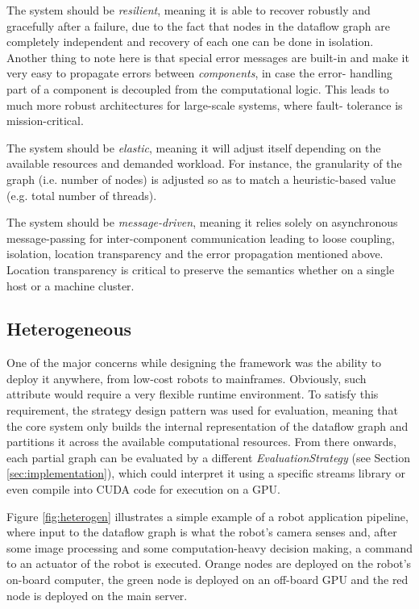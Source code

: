 \documentclass[sigplan,review,anonymous]{acmart}
\begin{document}
The system should be \textit{resilient}, meaning it is able to recover robustly
and gracefully after a failure, due to the fact that nodes in the dataflow graph
are completely independent and recovery of each one can be done in isolation.
Another thing to note here is that special error messages are built-in and make
it very easy to propagate errors between \textit{components}, in case the error-
handling part of a component is decoupled from the computational logic. This
leads to much more robust architectures for large-scale systems, where fault-
tolerance is mission-critical.

The system should be \textit{elastic}, meaning it will adjust itself depending
on the available resources and demanded workload. For instance, the granularity
of the graph (i.e. number of nodes) is adjusted so as to match a heuristic-based
value (e.g. total number of threads).

The system should be \textit{message-driven}, meaning it relies solely on
asynchronous message-passing for inter-component communication leading to loose
coupling, isolation, location transparency and the error propagation mentioned
above. Location transparency is critical to preserve the semantics whether on a
single host or a machine cluster.

\subsection{Heterogeneous}

One of the major concerns while designing the framework was the ability to
deploy it anywhere, from low-cost robots to mainframes. Obviously, such
attribute would require a very flexible runtime environment. To satisfy this
requirement, the strategy design pattern was used for evaluation, meaning that
the core system only builds the internal representation of the dataflow graph
and partitions it across the available computational resources. From there
onwards, each partial graph can be evaluated by a different
\textit{EvaluationStrategy} (see Section \ref{sec:implementation}), which could
interpret it using a specific streams library or even compile into CUDA code for
execution on a GPU.

Figure \ref{fig:heterogen} illustrates a simple example of a robot application
pipeline, where input to the dataflow graph is what the robot's camera senses
and, after some image processing and some computation-heavy decision making, a
command to an actuator of the robot is executed. Orange nodes are deployed on
the robot's on-board computer, the green node is deployed on an off-board GPU
and the red node is deployed on the main server.
\end{document}
